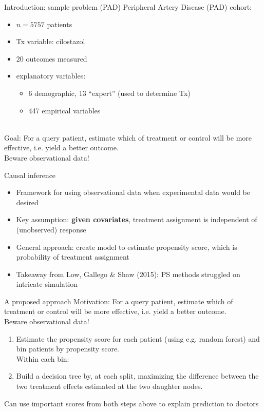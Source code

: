 \documentclass{beamer}
\begin{document}
\begin{frame}{Introduction: sample problem (PAD)}
Peripheral Artery Disease (PAD) cohort:
\begin{itemize}
    \item $n = 5757$ patients
    \item Tx variable: cilostazol
    \item 20 outcomes measured
    \item explanatory variables:
    \begin{itemize}
        \item 6 demographic, 13 ``expert'' (used to determine Tx)
        \item 447 empirical variables
    \end{itemize}
\end{itemize}~\\
Goal: For a query patient, estimate which of treatment or control will be
more effective, i.e. yield a better outcome.\\
Beware observational data!
\end{frame}

\begin{frame}{Causal inference}
\begin{itemize}
\item Framework for using observational data when experimental data would be
    desired
\item Key assumption: {\bf given covariates}, treatment assignment is
    independent of (unobserved) response
\item General approach: create model to estimate propensity score, which is
    probability of treatment assignment
\item Takeaway from Low, Gallego \& Shaw (2015): PS methods struggled on
    intricate simulation
\end{itemize}
\end{frame}

\begin{frame}{A proposed approach}
Motivation: For a query patient, estimate which of treatment or control will be
more effective, i.e. yield a better outcome.\\
Beware observational data!
\begin{enumerate}
\item Estimate the propensity score for each patient (using e.g. random forest)
    and bin patients by propensity score.\\
    Within each bin:
\item Build a decision tree by, at each split, maximizing the difference
    between the two treatment effects estimated at the two daughter nodes.
\end{enumerate}
Can use important scores from both steps above to explain prediction to doctors
\end{frame}
\end{document}
